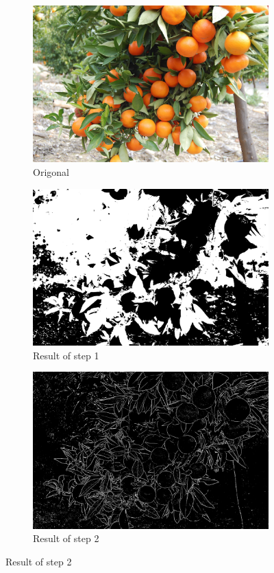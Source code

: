 \documentclass[conference]{IEEEtran}
\begin{document}
\begin{figure}[H]
  \begin{subfigure}{.3\linewidth}
 	 \includegraphics[width=\linewidth]{citrus1/citrus1_orig.jpg}\hfill
	 \caption{Origonal}
  \end{subfigure}
  \begin{subfigure}{.3\linewidth}
  	\includegraphics[width=\linewidth]{citrus1/citrus1_NDI.jpg}\hfill
   	\caption{Result of step 1}
  \end{subfigure}
  \begin{subfigure}{.3\linewidth}
  	\includegraphics[width=\linewidth]{citrus1/citrus1_mean.jpg}
  	\caption{Result of step 2}
  \end{subfigure}\par\medskip
  

\end{figure}
\end{document}
